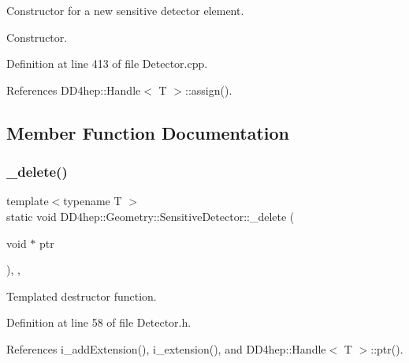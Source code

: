 Constructor for a new sensitive detector element. 

Constructor. 

Definition at line 413 of file Detector.\+cpp.



References D\+D4hep\+::\+Handle$<$ T $>$\+::assign().



\subsection{Member Function Documentation}
\hypertarget{class_d_d4hep_1_1_geometry_1_1_sensitive_detector_ab047704cfbeb2fc5ce87d752f44e187d}{}\label{class_d_d4hep_1_1_geometry_1_1_sensitive_detector_ab047704cfbeb2fc5ce87d752f44e187d} 
\subsubsection{\texorpdfstring{\+\_\+delete()}{\_delete()}}
{\footnotesize\ttfamily template$<$typename T $>$ \\
static void D\+D4hep\+::\+Geometry\+::\+Sensitive\+Detector\+::\+\_\+delete (\begin{DoxyParamCaption}\item[{void $\ast$}]{ptr }\end{DoxyParamCaption})\hspace{0.3cm}{\ttfamily [inline]}, {\ttfamily [static]}, {\ttfamily [protected]}}



Templated destructor function. 



Definition at line 58 of file Detector.\+h.



References i\+\_\+add\+Extension(), i\+\_\+extension(), and D\+D4hep\+::\+Handle$<$ T $>$\+::ptr().

\hypertarget{class_d_d4hep_1_1_geometry_1_1_sensitive_detector_a08e631451403e41de85669fa625eb86e}{}\label{class_d_d4hep_1_1_geometry_1_1_sensitive_detector_a08e631451403e41de85669fa625eb86e} 
